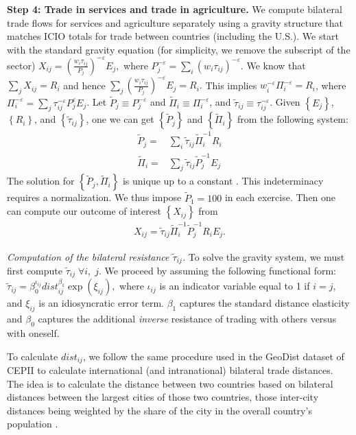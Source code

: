 \documentclass[12pt]{article}
\newcommand{\bq}{\begin{eqnarray}}
\newcommand{\eq}{\end{eqnarray}}
\begin{document}
\textbf{Step 4: Trade in services and trade in agriculture.} We compute bilateral trade flows for services and agriculture separately using a gravity structure that matches ICIO totals for trade between countries (including the U.S.). We start with the standard gravity equation (for simplicity, we remove the subscript of the sector) $X_{ij}=\left(\tfrac{w_{i}\tau_{ij}}{P_{j}}\right)^{-\varepsilon}E_{j},$
where $P_{j}^{-\varepsilon}=\sum_{i}\left(w_{i}\tau_{ij}\right)^{-\varepsilon}$. We know that $\sum_{j}X_{ij}=R_{i}$ and hence $\sum_{j}\left(\frac{w_{i}\tau_{ij}}{P_{j}} \right)^{-\varepsilon}E_{j}=R_{i}.$ This implies $w_{i}^{-\varepsilon} \Pi_{i}^{-\varepsilon}=R_{i}$, where $\Pi_{i}^{-\varepsilon}= \sum_{j} \tau_{ij}^{ -\varepsilon}P_{j}^{\varepsilon}E_{j}$. Let $\tilde{P}_{j}\equiv P_{j}^{-\varepsilon}$ and $\tilde{\Pi}_{i}\equiv \Pi_{i}^{-\varepsilon}$, and $\tilde{\tau}_{ij}\equiv\tau_{ij}^{-\varepsilon}$. Given $\left\{ E_{j}\right\}$,  $\left\{ R_{i}\right\}$,  and $\left\{ \tilde{\tau}_{ij}\right\}$, one we can get $\left\{ \tilde{P}_{j}\right\}$  and $\left\{ \tilde{\Pi}_{i}\right\}$ from the following system:
\begin{align}
\tilde{P}_{j}=&\sum_{i}\tilde{\tau}_{ij}\tilde{\Pi}_{i}^{-1}R_{i} \nonumber \\  \tilde{\Pi}_{i}=&\sum_{j}\tilde{\tau}_{ij}\tilde{P}_{j}^{-1}E_{j} \label{eq:grav_system_gen}
\end{align}
The solution for $\left\{ \tilde{P}_{j}, \tilde{\Pi}_{i} \right\}$ is unique up to a constant \citep{fally2015structural}. This indeterminacy requires a normalization. We thus impose $\tilde{P}_{1}=100$ in each exercise. Then one can compute our outcome of interest $\left\{ X_{ij}\right\}$  from
\bq
X_{ij}=\tilde{\tau}_{ij}\tilde{\Pi}_{i}^{-1}\tilde{P}_{j}^{-1}R_{i}E_{j}. \label{eq:grav_bilat}
\eq

\noindent \textit{{Computation of the bilateral resistance $\tilde{\tau}_{ij}$.}} To solve the gravity system, we must first compute $\tilde{\tau}_{ij}\; \forall i,\;j$. We proceed by assuming the following functional form: $\tilde{\tau}_{ij}=\beta_{0}^{\iota_{ij}}dist_{ij}^{\beta_{1}}\exp\left(\xi_{ij}\right),$ where $\iota_{ij}$ is an indicator variable equal to 1 if $i=j$, and $\xi_{ij}$ is an idiosyncratic error term. $\beta_{1}$ captures the standard distance elasticity and $\beta_{0}$ captures the additional \textit{inverse} resistance of trading with others versus with oneself. 

To calculate $dist_{ij}$, we follow the same procedure used in the GeoDist dataset of CEPII to calculate international (and intranational) bilateral trade distances. The idea is to calculate the distance between two countries based on bilateral distances between the largest cities of those two countries, those inter-city distances being weighted by the share of the city in the overall country's population \citep{head2002illusory}.
\end{document}
